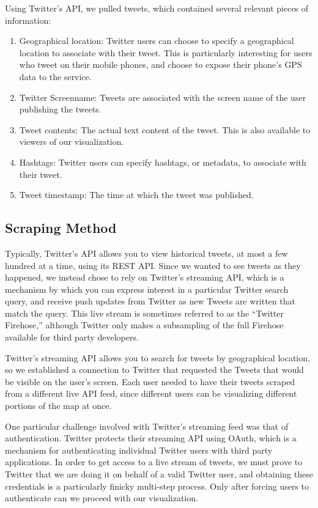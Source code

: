 \documentclass[pdftex,12pt,a4paper]{article}
\begin{document}
Using Twitter's API, we pulled tweets, which contained several relevant pieces of information:
\begin{enumerate}
\item Geographical location: Twitter users can choose to specify a geographical location to associate with their tweet. This is particularly interesting for users who tweet on their mobile phones, and choose to expose their phone's GPS data to the service.
\item Twitter Screenname: Tweets are associated with the screen name of the user publishing the tweets.
\item Tweet contents: The actual text content of the tweet. This is also available to viewers of our visualization.
\item Hashtags: Twitter users can specify hashtags, or metadata, to associate with their tweet. 
\item Tweet timestamp: The time at which the tweet was published.
\end{enumerate}

\subsection{Scraping Method}

Typically, Twitter's API allows you to view historical tweets, at most a few
hundred at a time, using its REST API. Since we wanted to see tweets as they
happened, we instead chose to rely on Twitter's streaming API, which is a
mechanism by which you can express interest in a particular Twitter search
query, and receive push updates from Twitter as new Tweets are written that
match the query. This live stream is sometimes referred to as the ``Twitter
Firehose,'' although Twitter only makes a subsampling of the full Firehose
available for third party developers.

Twitter's streaming API allows you to search for tweets by geographical
location, so we established a connection to Twitter that requested the Tweets
that would be visible on the user's screen. Each user needed to have their
tweets scraped from a different live API feed, since different users can be
visualizing different portions of the map at once.

One particular challenge involved with Twitter's streaming feed was that of
authentication. Twitter protects their streaming API using OAuth, which is a
mechanism for authenticating individual Twitter users with third party
applications. In order to get access to a live stream of tweets, we must prove
to Twitter that we are doing it on behalf of a valid Twitter user, and obtaining
these credentials is a particularly finicky multi-step process. Only after
forcing users to authenticate can we proceed with our visualization.
\end{document}
